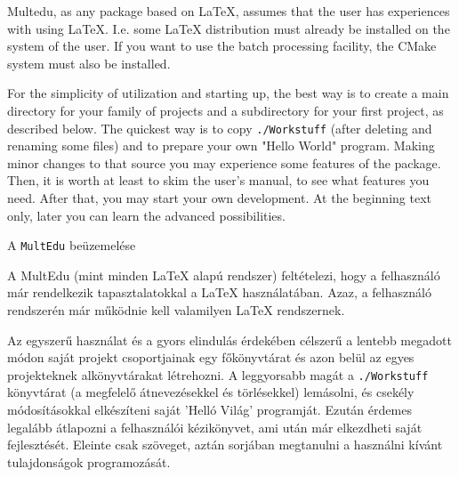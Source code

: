 {
\gls{Multedu}, as any package based on \LaTeX, assumes that the user has
experiences with using \LaTeX. I.e. some \LaTeX{} distribution must already be installed on the system of the user. If you want to use the
batch processing facility, the CMake system must also be installed.

For the simplicity of utilization and starting up, 
the best way is to create a main directory for your family of projects and a subdirectory for your first project, 
as described below. The quickest way is to copy \lstinline|./Workstuff| (after deleting and renaming some files)
and to prepare your own "Hello World" program.
Making minor changes to that source you may experience
some features of the package. Then, it is worth at least to skim the user's manual, to see what features you need. After that, you may start your own development.
At the beginning text only, later you can learn the advanced
possibilities.
}
{A \lstinline|MultEdu| beüzemelése}
{
A \gls{MultEdu} (mint minden \LaTeX{} alapú rendszer) feltételezi, hogy 
a felhasználó már rendelkezik tapasztalatokkal a \LaTeX{}  használatában.
Azaz, a felhasználó rendszerén már működnie kell valamilyen \LaTeX{}
rendszernek.

Az egyszerű használat és a gyors elindulás érdekében célszerű a 
lentebb megadott módon saját projekt csoportjainak egy főkönyvtárat és
azon belül az egyes projekteknek alkönyvtárakat létrehozni.
A leggyorsabb magát a \lstinline|./Workstuff| könyvtárat (a megfelelő átnevezésekkel és törlésekkel) lemásolni, és csekély 
módosításokkal elkészíteni saját 'Helló Világ' programját.
Ezután érdemes legalább átlapozni a
felhasználói kézikönyvet, ami után már elkezdheti saját fejlesztését.
Eleinte csak szöveget, aztán sorjában megtanulni a használni kívánt tulajdonságok programozását.
}


